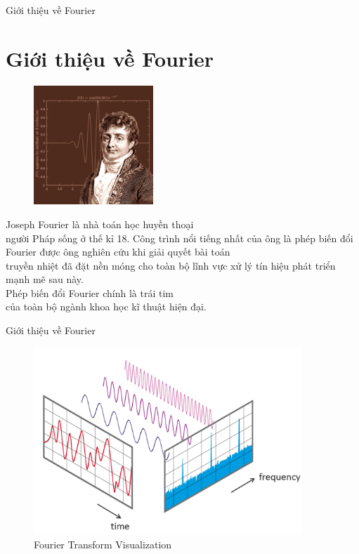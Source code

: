 \documentclass[8pt]{beamer}
\begin{document}
\begin{frame}{Giới thiệu về Fourier}
\section{Giới thiệu về Fourier}
\begin{figure} %
    \centering
    \includegraphics[width=0.4\textwidth]{Fourier-1000.jpg}
\end{figure}
Joseph Fourier là nhà toán học huyền thoại \\
người Pháp sống ở thế kỉ 18. Công trình nổi tiếng nhất của 
ông là phép biến đổi Fourier được ông nghiên cứu khi giải quyết bài toán \\
truyền nhiệt đã đặt nền móng cho toàn bộ lĩnh vực xử lý tín hiệu phát triển mạnh mẽ sau này. 
\\ Phép biến đổi Fourier chính là trái tim\\ của toàn bộ ngành khoa học kĩ thuật hiện đại.

\end{frame}
\begin{frame}{Giới thiệu về Fourier}
\begin{figure}[h]
			\includegraphics[width=0.9\textwidth]{FFT-Time-Frequency-View-540.png}
			\caption{Fourier Transform Visualization}\label{fig:re11}
		\end{figure}

\end{frame}
\end{document}
